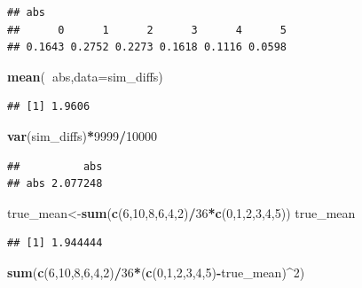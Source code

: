 \documentclass[
]{book}
\newenvironment{Shaded}{\begin{snugshade}}{\end{snugshade}}
\newcommand{\DataTypeTok}[1]{\textcolor[rgb]{0.13,0.29,0.53}{#1}}
\newcommand{\DecValTok}[1]{\textcolor[rgb]{0.00,0.00,0.81}{#1}}
\newcommand{\KeywordTok}[1]{\textcolor[rgb]{0.13,0.29,0.53}{\textbf{#1}}}
\newcommand{\NormalTok}[1]{#1}
\newcommand{\OperatorTok}[1]{\textcolor[rgb]{0.81,0.36,0.00}{\textbf{#1}}}
\begin{document}
\begin{verbatim}
## abs
##      0      1      2      3      4      5 
## 0.1643 0.2752 0.2273 0.1618 0.1116 0.0598
\end{verbatim}

\begin{Shaded}
\begin{Highlighting}[]
\KeywordTok{mean}\NormalTok{(}\OperatorTok{~}\NormalTok{abs,}\DataTypeTok{data=}\NormalTok{sim_diffs)}
\end{Highlighting}
\end{Shaded}

\begin{verbatim}
## [1] 1.9606
\end{verbatim}

\begin{Shaded}
\begin{Highlighting}[]
\KeywordTok{var}\NormalTok{(sim_diffs)}\OperatorTok{*}\DecValTok{9999}\OperatorTok{/}\DecValTok{10000}
\end{Highlighting}
\end{Shaded}

\begin{verbatim}
##          abs
## abs 2.077248
\end{verbatim}

\begin{Shaded}
\begin{Highlighting}[]
\NormalTok{true_mean<-}\KeywordTok{sum}\NormalTok{(}\KeywordTok{c}\NormalTok{(}\DecValTok{6}\NormalTok{,}\DecValTok{10}\NormalTok{,}\DecValTok{8}\NormalTok{,}\DecValTok{6}\NormalTok{,}\DecValTok{4}\NormalTok{,}\DecValTok{2}\NormalTok{)}\OperatorTok{/}\DecValTok{36}\OperatorTok{*}\KeywordTok{c}\NormalTok{(}\DecValTok{0}\NormalTok{,}\DecValTok{1}\NormalTok{,}\DecValTok{2}\NormalTok{,}\DecValTok{3}\NormalTok{,}\DecValTok{4}\NormalTok{,}\DecValTok{5}\NormalTok{))}
\NormalTok{true_mean}
\end{Highlighting}
\end{Shaded}

\begin{verbatim}
## [1] 1.944444
\end{verbatim}

\begin{Shaded}
\begin{Highlighting}[]
\KeywordTok{sum}\NormalTok{(}\KeywordTok{c}\NormalTok{(}\DecValTok{6}\NormalTok{,}\DecValTok{10}\NormalTok{,}\DecValTok{8}\NormalTok{,}\DecValTok{6}\NormalTok{,}\DecValTok{4}\NormalTok{,}\DecValTok{2}\NormalTok{)}\OperatorTok{/}\DecValTok{36}\OperatorTok{*}\NormalTok{(}\KeywordTok{c}\NormalTok{(}\DecValTok{0}\NormalTok{,}\DecValTok{1}\NormalTok{,}\DecValTok{2}\NormalTok{,}\DecValTok{3}\NormalTok{,}\DecValTok{4}\NormalTok{,}\DecValTok{5}\NormalTok{)}\OperatorTok{-}\NormalTok{true_mean)}\OperatorTok{^}\DecValTok{2}\NormalTok{)}
\end{Highlighting}
\end{Shaded}
\end{document}
